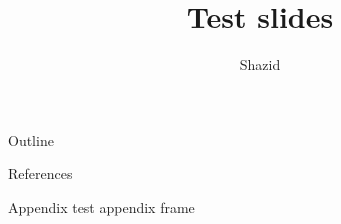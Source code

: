 \documentclass[12pt, aspectratio=169]{beamer}
\title{Test slides}
\author{Shazid}
\begin{document}
	{
		\addtocounter{framenumber}{-2}    %

		\begin{frame}
			\titlepage
		\end{frame}

		\begin{frame}{Outline}
			\tableofcontents[subsectionstyle=hide]
		\end{frame}
	}

	

	\appendix

	\begingroup
		\renewcommand{\section}[2]{}%
		\begin{frame}[allowframebreaks]{References}
			\Wider{
				\def\bibfont{\footnotesize}
				
			}
		\end{frame}
	\endgroup

    \begin{frame}{Appendix}
        test appendix frame
    \end{frame}
\end{document}

